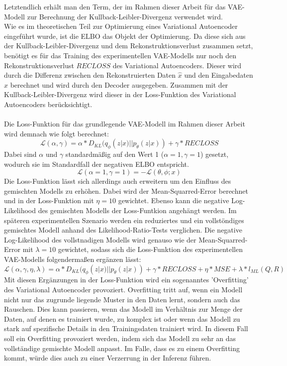 \documentclass[%
thesis=student,%
coverpage=false,%
titlepage=false,%
headmarks=true, %
german,%
font=libertine, %
math=newpxtx, %
BCOR=5mm,%
coverBCOR=11mm%
]{tumbook}
\theoremstyle{break}
\begin{document}
Letztendlich erhält man den Term, der im Rahmen dieser Arbeit für das VAE-Modell zur Berechnung der Kullback-Leibler-Divergenz verwendet wird.\\
Wie es im theoretischen Teil zur Optimierung eines Variational Autoencoder eingeführt wurde, ist die ELBO das Objekt der Optimierung. Da diese sich aus der Kullback-Leibler-Divergenz und dem Rekonstruktionsverlust zusammen setzt, benötigt es für das Training des experimentellen VAE-Modells nur noch den Rekonstruktionsverlust $RECLOSS$ des Variational Autoencoders.
Dieser wird durch die Differenz zwischen den Rekonstruierten Daten $\hat{x}$ und den Eingabedaten $x$ berechnet und wird durch den Decoder ausgegeben. Zusammen mit der Kullback-Leibler-Divergenz wird dieser in der Loss-Funktion des Variational Autoencoders berücksichtigt.\\
\\
Die Loss-Funktion für das grundlegende VAE-Modell im Rahmen dieser Arbeit wird demnach wie folgt berechnet:\\
$$ \mathcal{L}(\alpha, \gamma) = \alpha * D_{KL}(q_\phi(z|x)||p_\theta(z|x)) + \gamma * RECLOSS $$
Dabei sind $\alpha$ und $\gamma$ standardmäßig auf den Wert 1 ($\alpha=1, \gamma=1$) gesetzt, wodurch sie im Standardfall der negativen ELBO entspricht.
$$ \mathcal{L}(\alpha=1, \gamma=1) = - \mathcal{L}(\theta,\phi;x) $$
Die Loss-Funktion lässt sich allerdings auch erweitern um den Einfluss des gemischten Modells zu erhöhen. Dabei wird der Mean-Squarred-Error berechnet und in der Loss-Funktion mit $\eta = 10$ gewichtet. Ebenso kann die negative Log-Likelihood des gemischten Modells der Loss-Funtkion angehängt werden. Im späteren experimentellen Szenario werden ein reduziertes und ein vollstöndiges gemischtes Modell anhand des Likelihood-Ratio-Tests verglichen. Die negative Log-Likelihood des vollstnadigen Modells wird genauso wie der Mean-Squarred-Error mit $\lambda = 10$ gewichtet, sodass sich die Loss-Funktion des experimentellen VAE-Modells folgendermaßen ergänzen lässt:
$$ \mathcal{L}(\alpha,\gamma,\eta,\lambda) = \alpha * D_{KL}(q_\phi(z|x)||p_\theta(z|x)) + \gamma * RECLOSS + \eta * MSE + \lambda * l_{ML}(Q,R)$$
Mit diesen Ergänzungen in der Loss-Funktion wird ein sogenanntes 'Overfitting' des Variational Autoencoder provoziert. Overfitting tritt auf, wenn ein Modell nicht nur das zugrunde liegende Muster in den Daten lernt, sondern auch das Rauschen. Dies kann passieren, wenn das Modell im Verhältnis zur Menge der Daten, auf denen es trainiert wurde, zu komplex ist oder wenn das Modell zu stark auf spezifische Details in den Trainingsdaten trainiert wird. In diesem Fall soll ein Overfitting provoziert werden, indem sich das Modell zu sehr an das vollständige gemischte Modell anpasst. Im Falle, dass es zu einem Overfitting kommt, würde dies auch zu einer Verzerrung in der Inferenz führen.
\end{document}
